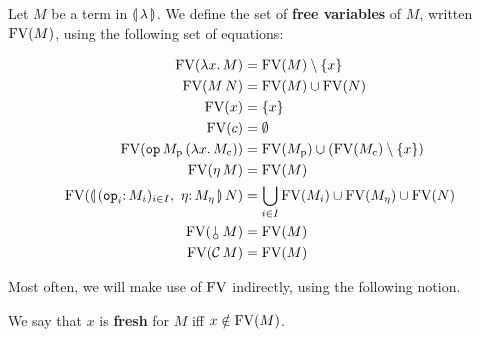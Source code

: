 \begin{definition}
  Let $M$ be a term in ${\llparenthesis \, \lambda \, \rrparenthesis}$. We define the set of \textbf{free
    variables} of $M$, written $\operatorname{FV}(M)$, using the following set of
  equations:

  \begin{align*}
    \FV(\lam{x}{M}) &= \FV(M) \setminus \{x\} \\
    \FV(\ap{M}{N}) &= \FV(M) \cup \FV(N) \\
    \FV(x) &= \{x\} \\
    \FV(c) &= \emptyset \\
    \FV(\app{\op{op}}{M_\petitp}{(\lam{x}{M_\petitc})})
    &= \FV(M_\petitp) \cup (\FV(M_\petitc) \setminus \{x\}) \\
    \FV(\ap{\eta}{M}) &= \FV(M) \\
    \FV(\ap{\cibanana}{N})
    &= \bigcup_{i \in I} \FV(M_i) \cup \FV(M_\eta) \cup \FV(N) \\
    \FV(\ap{\cherry}{M}) &= \FV(M) \\
    \FV(\ap{\CC}{M}) &= \FV(M)
  \end{align*}
\end{definition}

Most often, we will make use of $\operatorname{FV}$ indirectly, using the following
notion.

\begin{definition}
  We say that $x$ is \textbf{fresh} for $M$ iff $x \notin \operatorname{FV}(M)$.
\end{definition}


